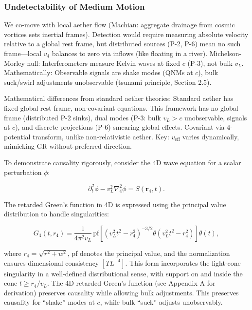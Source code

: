 \subsubsection{Undetectability of Medium Motion}

We co-move with local aether flow (Machian: aggregate drainage from cosmic vortices sets inertial frames). Detection would require measuring absolute velocity relative to a global rest frame, but distributed sources (P-2, P-6) mean no such frame—local $v_4$ balances to zero via inflows (like floating in a river). Michelson-Morley null: Interferometers measure Kelvin waves at fixed $c$ (P-3), not bulk $v_L$. Mathematically: Observable signals are shake modes (QNMs at $c$), bulk suck/swirl adjustments unobservable (tsunami principle, Section 2.5).

Mathematical differences from standard aether theories: Standard aether has fixed global rest frame, non-covariant equations. This framework has no global frame (distributed P-2 sinks), dual modes (P-3: bulk $v_L > c$ unobservable, signals at $c$), and discrete projections (P-6) smearing global effects. Covariant via 4-potential transform, unlike non-relativistic aether. Key: $v_{\text{eff}}$ varies dynamically, mimicking GR without preferred direction.

To demonstrate causality rigorously, consider the 4D wave equation for a scalar perturbation $\phi$:

\begin{equation}
\partial_t^2 \phi - v_L^2 \nabla_4^2 \phi = S(\mathbf{r}_4, t).
\end{equation}

The retarded Green's function in 4D is expressed using the principal value distribution to handle singularities:

\begin{equation}
G_4(t, r_4) = \frac{1}{4 \pi^2 v_L} \, \text{pf} \left[ (v_L^2 t^2 - r_4^2)^{-3/2} \theta(v_L^2 t^2 - r_4^2) \right] \theta(t),
\end{equation}

where $r_4 = \sqrt{r^2 + w^2}$, pf denotes the principal value, and the normalization ensures dimensional consistency $[T L^{-4}]$. This form incorporates the light-cone singularity in a well-defined distributional sense, with support on and inside the cone $t \geq r_4 / v_L$. The 4D retarded Green's function (see Appendix A for derivation) preserves causality while allowing bulk adjustments. This preserves causality for ``shake'' modes at $c$, while bulk ``suck'' adjusts unobservably.

